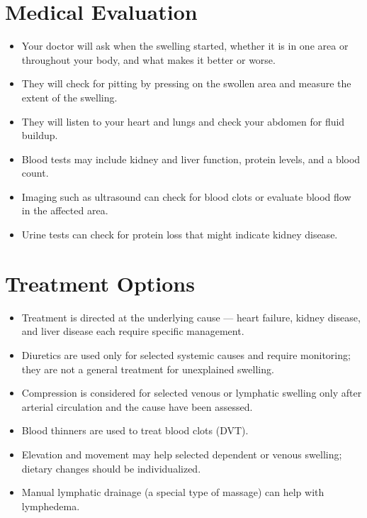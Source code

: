 \section*{Medical Evaluation}
\begin{itemize}
  \item Your doctor will ask when the swelling started, whether it is in one area or throughout your body, and what makes it better or worse.
  \item They will check for pitting by pressing on the swollen area and measure the extent of the swelling.
  \item They will listen to your heart and lungs and check your abdomen for fluid buildup.
  \item Blood tests may include kidney and liver function, protein levels, and a blood count.
  \item Imaging such as ultrasound can check for blood clots or evaluate blood flow in the affected area.
  \item Urine tests can check for protein loss that might indicate kidney disease.
\end{itemize}

\section*{Treatment Options}
\begin{itemize}
  \item Treatment is directed at the underlying cause — heart failure, kidney disease, and liver disease each require specific management.
  \item Diuretics are used only for selected systemic causes and require monitoring; they are not a general treatment for unexplained swelling.
  \item Compression is considered for selected venous or lymphatic swelling only after arterial circulation and the cause have been assessed.
  \item Blood thinners are used to treat blood clots (DVT).
  \item Elevation and movement may help selected dependent or venous swelling; dietary changes should be individualized.
  \item Manual lymphatic drainage (a special type of massage) can help with lymphedema.
\end{itemize}

